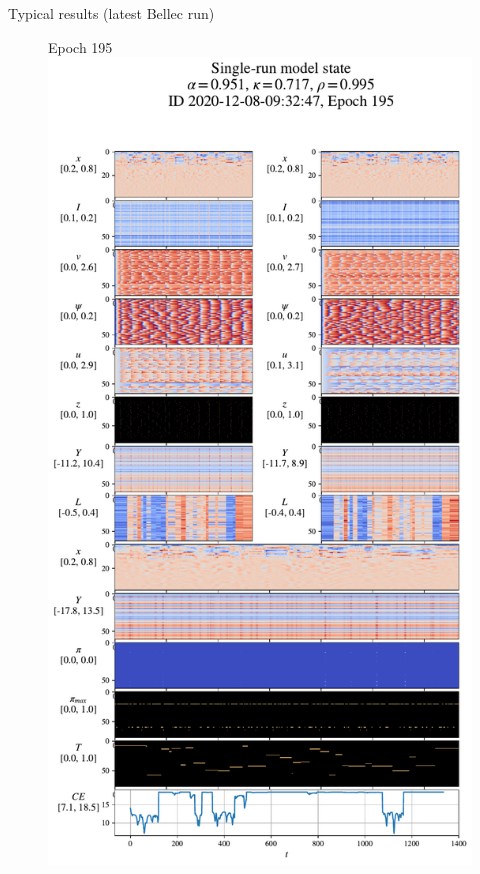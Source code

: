 \documentclass[t]{beamer}
\begin{document}
\begin{frame}{Typical results (latest Bellec run)}
\begin{figure}[!ht]
		Epoch 195\includegraphics[clip, trim=0cm 5.8cm 0cm 28.9cm, width=.6\linewidth]{state_195.pdf}  %
	\end{figure}

\end{frame}
\end{document}

